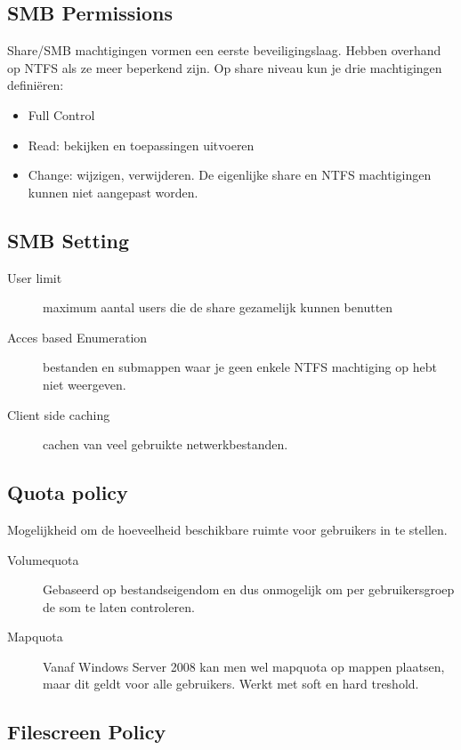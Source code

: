 \subsection{SMB Permissions}

Share/SMB machtigingen vormen een eerste beveiligingslaag. Hebben overhand op
NTFS als ze meer beperkend zijn. Op share niveau kun je drie machtigingen
definiëren:
\begin{itemize}
	\item Full Control
	\item Read: bekijken en toepassingen uitvoeren
	\item Change: wijzigen, verwijderen. De eigenlijke share en NTFS
		machtigingen kunnen niet aangepast worden.
\end{itemize}

\subsection{SMB Setting}

\begin{description}
	\item[User limit] maximum aantal users die de share gezamelijk kunnen
		benutten
	\item[Acces based Enumeration] bestanden en submappen waar je geen
		enkele NTFS machtiging op hebt niet weergeven.
	\item[Client side caching] cachen van veel gebruikte netwerkbestanden.
\end{description}

\subsection{Quota policy}

Mogelijkheid om de hoeveelheid beschikbare ruimte voor gebruikers in te stellen.
\begin{description}
	\item[Volumequota] Gebaseerd op bestandseigendom en dus onmogelijk om
		per gebruikersgroep de som te laten controleren.
	\item[Mapquota] Vanaf Windows Server 2008 kan men wel mapquota op mappen
		plaatsen, maar dit geldt voor alle gebruikers. Werkt met soft en
		hard treshold.
\end{description}

\subsection{Filescreen Policy}

